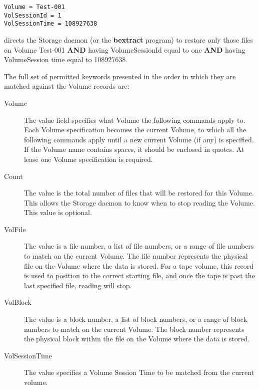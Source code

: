 \footnotesize
\begin{verbatim}
Volume = Test-001
VolSessionId = 1
VolSessionTime = 108927638
\end{verbatim}
\normalsize

directs the Storage daemon (or the {\bf bextract} program) to restore only
those files on Volume Test-001 {\bf AND} having VolumeSessionId equal to one
{\bf AND} having VolumeSession time equal to 108927638.

The full set of permitted keywords presented in the order in which they are
matched against the Volume records are:

\begin{description}

\item [Volume]
   The value field specifies what Volume the following commands apply to.
   Each Volume specification becomes the current Volume, to which all the
   following commands apply until a new current Volume (if any) is
   specified.  If the Volume name contains spaces, it should be enclosed in
   quotes. At lease one Volume specification is required.

\item [Count]
   The value is the total number of files that  will be restored for this Volume.
   This allows the Storage  daemon to know when to stop reading the Volume.
   This value is optional.

\item [VolFile]
   The value is a file number, a list of file numbers, or a range of file
   numbers to match on the current Volume.  The file number represents the
   physical file on the Volume where the data is stored.  For a tape
   volume, this record is used to position to the correct starting file,
   and once the tape is past the last specified file, reading will stop.

\item [VolBlock]
   The value is a block number, a list of block numbers, or a range of
   block numbers to match on the current Volume.  The block number
   represents the physical block within the file on the Volume where the
   data is stored.


\item [VolSessionTime]
   The value specifies a Volume Session Time to  be matched from the current
   volume.


\end{description}
